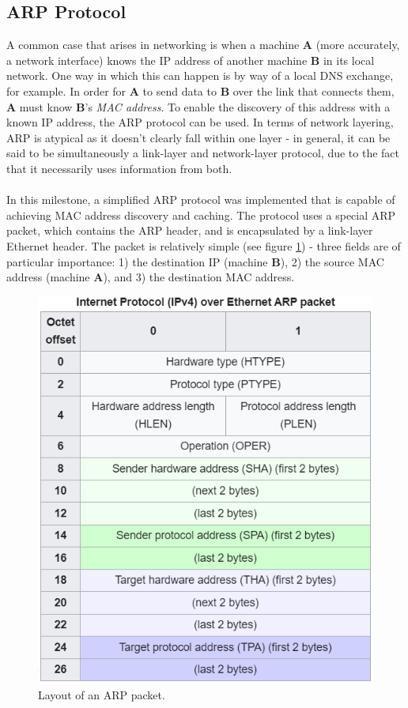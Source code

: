 \subsection{ARP Protocol}
A common case that arises in networking is when a machine \textbf{A} (more accurately, a network interface) knows the IP address of another machine \textbf{B} in its local network. One way in which this can happen is by way of a local DNS exchange, for example. In order for \textbf{A} to send data to \textbf{B} over the link that connects them, \textbf{A} must know \textbf{B}'s \textit{MAC address}. To enable the discovery of this address with a known IP address, the ARP protocol can be used. In terms of network layering, ARP is atypical as it doesn't clearly fall within one layer - in general, it can be said to be simultaneously a link-layer and network-layer protocol, due to the fact that it necessarily uses information from both.
\\\\
In this milestone, a simplified ARP protocol was implemented that is capable of achieving MAC address discovery and caching. The protocol uses a special ARP packet, which contains the ARP header, and is encapsulated by a link-layer Ethernet header. The packet is relatively simple (see figure \ref{figure:arp-packet}) - three fields are of particular importance: 1) the destination IP (machine \textbf{B}), 2) the source MAC address (machine \textbf{A}), and 3) the destination MAC address.
\begin{figure}[ht]
    \centering
    \includegraphics[width=0.6\columnwidth]{images/m7-networking-arppacket.png}
    \caption{Layout of an ARP packet. \cite{wikipedia}}
    \label{figure:arp-packet}
\end{figure}
